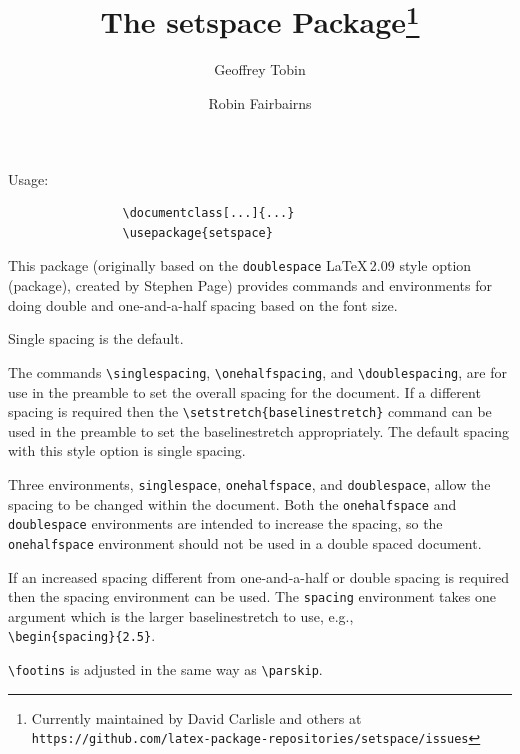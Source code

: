 \documentclass[a4paper]{article}
\title{The setspace Package\thanks{Currently maintained by David Carlisle and others at\\\texttt{https://github.com/latex-package-repositories/setspace/issues}}}
\date{\filedate}
\author{Geoffrey Tobin\and Robin Fairbairns}
\begin{document}
\maketitle

 Usage:

\begin{verbatim}
                \documentclass[...]{...}
                \usepackage{setspace}
\end{verbatim}


         This package (originally based on the \texttt{doublespace} \LaTeX\,2.09 style
         option (package),  created by Stephen Page)
         provides commands and environments for doing double and
         one-and-a-half spacing based on the font size.

         Single spacing is the default.

         The commands \verb|\singlespacing|, \verb|\onehalfspacing|, and
         \verb|\doublespacing|, are for use in the preamble to set the overall
         spacing for the document.  If a different spacing is required then
         the \verb|\setstretch{baselinestretch}| command can be used in the
         preamble to set the baselinestretch appropriately.  The default
         spacing with this style option is single spacing.

         Three environments, \verb|singlespace|, \verb|onehalfspace|,
         and \verb|doublespace|, allow the spacing to be changed
         within the document.  Both the \verb|onehalfspace| and
         \verb|doublespace| environments are intended to increase the
         spacing, so the \verb|onehalfspace| environment should not be
         used in a double spaced document.

         If an increased spacing different from one-and-a-half or
         double spacing is required then the spacing environment can
         be used.  The \verb|spacing| environment takes one argument
         which is the larger baselinestretch to use, e.g.,\\
         \verb|\begin{spacing}{2.5}|.

         \verb|\footins| is adjusted in the same way as \verb|\parskip|.


\clearpage
\addtolength\textwidth{100pt}
\addtolength\oddsidemargin{-70pt}
\setlength\columnseprule{1pt}
\setlength\columnsep{10pt}
\twocolumn
\tiny

\end{document}
